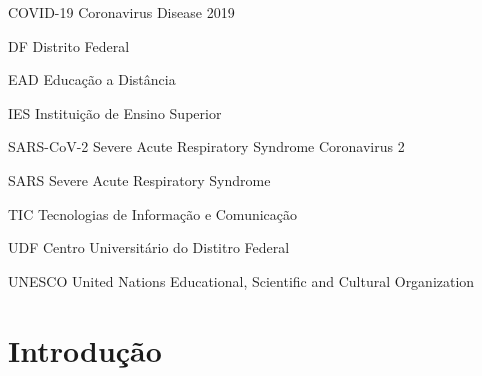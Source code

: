 \documentclass[
	arial,
	12pt,				%
	openright,			%
	oneside,
	a4paper,			%
	chapter=TITLE,		%
	english,			%
	french,				%
	spanish,			%
	brazil,				%
	]{abntex2}
\begin{document}
\cleardoublepage

\listoftables*
\cleardoublepage

\begin{siglas}
  \item[COVID-19] Coronavirus Disease 2019
  \item[DF] Distrito Federal
  \item[EAD] Educação a Distância
  \item[IES] Instituição de Ensino Superior
  \item[SARS-CoV-2] Severe Acute Respiratory Syndrome Coronavirus 2
  \item[SARS] Severe Acute Respiratory Syndrome
  \item[TIC] Tecnologias de Informação e Comunicação
  \item[UDF] Centro Universitário do Distitro Federal
  \item[UNESCO] United Nations Educational, Scientific and Cultural Organization
\end{siglas}


\tableofcontents*
\cleardoublepage


\textual

\chapter{Introdução}\label{introduction}
\end{document}
